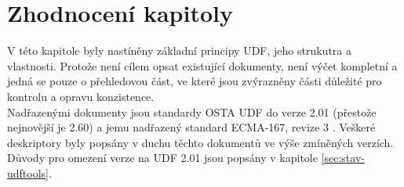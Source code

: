 \section{Zhodnocení kapitoly}
V této kapitole byly nastíněny základní principy UDF, jeho strukutra a vlastnosti. Protože není cílem opsat existující dokumenty, není výčet kompletní a jedná se pouze o přehledovou část, ve které jsou zvýrazněny části důležité pro kontrolu a opravu konzistence.\\
Nadřazenými dokumenty jsou standardy OSTA UDF do verze 2.01 \cite{osta-udf-0201} (přestože nejnovější je 2.60) a jemu nadřazený standard ECMA-167, revize 3 \cite{ecma-167}. Veškeré deskriptory byly popsány v duchu těchto dokumentů ve výše zmíněných verzích.\\
Důvody pro omezení verze na UDF 2.01 jsou popsány v kapitole \ref{sec:stav-udftools}.

